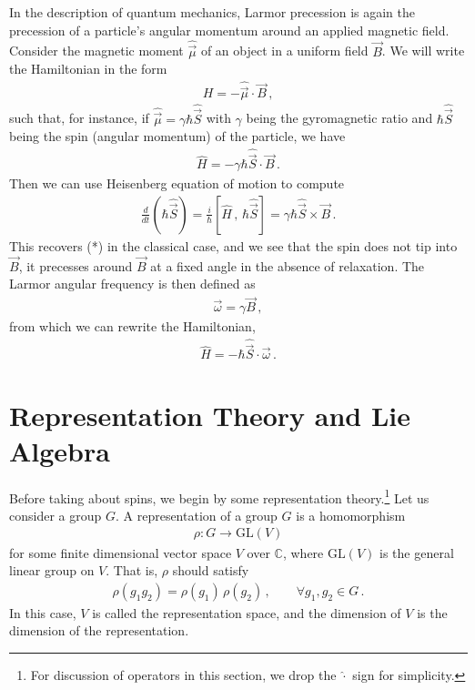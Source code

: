 \documentclass[11pt, onesided]{book}
\theoremstyle{break}
\theoremstyle{break}
\newcommand{\C}{\mathbb{C}}
\begin{document}
In the description of quantum mechanics, Larmor precession is again the precession of a particle's angular momentum around an applied magnetic field. Consider the magnetic moment $\hat{\vec{\mu}}$ of an object in a uniform field $\vec{B}$. We will write the Hamiltonian in the form 
\begin{align*}
H = -\hat{\vec{\mu}}\cdot \vec{B}\,,
\end{align*}
such that, for instance, if $\hat{\vec{\mu}} = \gamma \hbar\hat{\vec{S}}$ with $\gamma$ being the gyromagnetic ratio and $\hbar\hat{\vec{S}}$ being the spin (angular momentum) of the particle, we have
\begin{align*}
\hat{H} = -\gamma \hbar\hat{\vec{S}}\cdot \vec{B}\,.
\end{align*} 
Then we can use Heisenberg equation of motion to compute
\begin{align*}
\frac{d}{dt}(\hbar\hat{\vec{S}}) = \frac{i}{\hbar}[\hat{H}\,,\, \hbar\hat{\vec{S}}] = \gamma\hbar\hat{\vec{S}}\times \vec{B}\,.
\end{align*}
This recovers (*) in the classical case, and we see that the spin does not tip into $\vec{B}$, it precesses around $\vec{B}$ at a fixed angle in the absence of relaxation. The Larmor angular frequency is then defined as
\begin{align*}
\vec{\omega} = \gamma\vec{B}\,,
\end{align*}
from which we can rewrite the Hamiltonian,
\begin{align*}
\hat{H} = -\hbar \hat{\vec{S}} \cdot \vec{\omega}\,.
\end{align*}

\section{Representation Theory and Lie Algebra}
Before taking about spins, we begin by some representation theory.\footnote{For discussion of operators in this section, we drop the $\hat{\cdot}$ sign for simplicity.} Let us consider a group $G$. A representation of a group $G$ is a homomorphism
\begin{align*}
\rho: G \to \text{GL}(V)
\end{align*}
for some finite dimensional vector space $V$ over $\C$, where $\text{GL}(V)$ is the general linear group on $V$. That is, $\rho$ should satisfy
\begin{align*}
\rho(g_1g_2) = \rho(g_1) \, \rho(g_2) \,,\qquad
\forall g_1,g_2\in G\,.
\end{align*}
In this case, $V$ is called the representation space, and the dimension of $V$ is the dimension of the representation.\\
\end{document}

